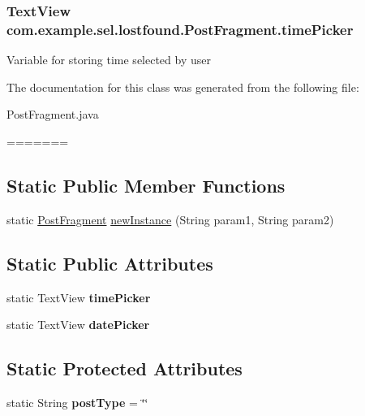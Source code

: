 \begin{DoxyCompactItemize}
{\subsubsection[{time\-Picker}]{\setlength{\rightskip}{0pt plus 5cm}Text\-View com.\-example.\-sel.\-lostfound.\-Post\-Fragment.\-time\-Picker\hspace{0.3cm}{\ttfamily [static]}}}\label{classcom_1_1example_1_1sel_1_1lostfound_1_1PostFragment_ac6d98a5b689bea76cf1248a20a54d23c}
Variable for storing time selected by user 

The documentation for this class was generated from the following file\-:\begin{DoxyCompactItemize}
\item 
Post\-Fragment.\-java\end{DoxyCompactItemize}
=======
\subsection*{\-Static \-Public \-Member \-Functions}
\begin{DoxyCompactItemize}
\item 
static \hyperlink{classcom_1_1example_1_1sel_1_1lostfound_1_1PostFragment}{\-Post\-Fragment} \hyperlink{classcom_1_1example_1_1sel_1_1lostfound_1_1PostFragment_a7350f5b81aa9144d9acdeca902676773}{new\-Instance} (\-String param1, \-String param2)
\end{DoxyCompactItemize}
\subsection*{\-Static \-Public \-Attributes}
\begin{DoxyCompactItemize}
\item 
\hypertarget{classcom_1_1example_1_1sel_1_1lostfound_1_1PostFragment_ac6d98a5b689bea76cf1248a20a54d23c}{static \-Text\-View {\bfseries time\-Picker}}\label{classcom_1_1example_1_1sel_1_1lostfound_1_1PostFragment_ac6d98a5b689bea76cf1248a20a54d23c}

\item 
\hypertarget{classcom_1_1example_1_1sel_1_1lostfound_1_1PostFragment_a1c187b07da5262cf568439018a826ef9}{static \-Text\-View {\bfseries date\-Picker}}\label{classcom_1_1example_1_1sel_1_1lostfound_1_1PostFragment_a1c187b07da5262cf568439018a826ef9}

\end{DoxyCompactItemize}
\subsection*{\-Static \-Protected \-Attributes}
\begin{DoxyCompactItemize}
\item 
\hypertarget{classcom_1_1example_1_1sel_1_1lostfound_1_1PostFragment_acb0672afa2382233136ee251bef7149b}{static \-String {\bfseries post\-Type} = \char`\"{}\char`\"{}}\label{classcom_1_1example_1_1sel_1_1lostfound_1_1PostFragment_acb0672afa2382233136ee251bef7149b}


\end{DoxyCompactItemize}
\end{DoxyCompactItemize}

